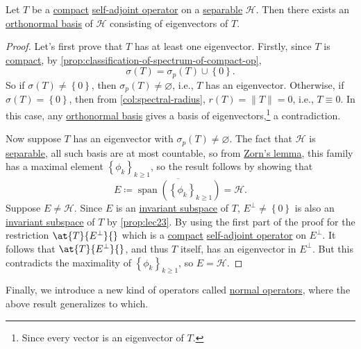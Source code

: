 \begin{theorem}\label{thm:spectral-theorem-for-compact-self-adjoint-op}
	Let \(T\) be a \hyperref[def:compact-op]{compact} \hyperref[def:self-adjoint-op]{self-adjoint operator} on a \hyperref[def:separable]{separable} \(\mathcal{H} \). Then there exists an \hyperref[def:orthonormal-basis]{orthonormal basis} of \(\mathcal{H} \) consisting of eigenvectors of \(T\).
\end{theorem}
\begin{proof}
	Let's first prove that \(T\) has at least one eigenvector. Firstly, since \(T\) is \hyperref[def:compact-op]{compact}, by \autoref{prop:classification-of-spectrum-of-compact-op},
	\[
		\sigma (T) = \sigma _p(T) \cup \left\{ 0 \right\}.
	\]
	So if \(\sigma (T) \neq \left\{ 0 \right\} \), then \(\sigma _p(T) \neq \varnothing \), i.e., \(T\) has an eigenvector. Otherwise, if \(\sigma (T) = \left\{ 0 \right\} \), then from \autoref{col:spectral-radius}, \(r(T) = \lVert T \rVert = 0\), i.e., \(T \equiv 0\). In this case, any \hyperref[def:orthonormal-basis]{orthonormal basis} gives a basis of eigenvectors,\footnote{Since every vector is an eigenvector of \(T\).} a contradiction.

	Now suppose \(T\) has an eigenvector with \(\sigma_p (T) \neq \varnothing \). The fact that \(\mathcal{H} \) is \hyperref[def:separable]{separable}, all such basis are at most countable, so from \href{https://en.wikipedia.org/wiki/Zorn%27s_lemma}{Zorn's lemma}, this family has a maximal element \(\left\{ \phi _k \right\}_{k\geq 1} \), so the result follows by showing that 
	\[
		E \coloneqq \overline{\mathop{\mathrm{span}}(\left\{ \phi _k \right\}_{k\geq 1} )} = \mathcal{H} .
	\]
	Suppose \(E \neq \mathcal{H} \). Since \(E\) is an \hyperref[def:invariant-subspace]{invariant subspace} of \(T\), \(E^{\perp} \neq \left\{ 0 \right\} \) is also an \hyperref[def:invariant-subspace]{invariant subspace} of \(T\) by \autoref{prop:lec23}. By using the first part of the proof for the restriction \(\at{T}{E^{\perp} }{} \) which is a \hyperref[def:compact-op]{compact} \hyperref[def:self-adjoint-op]{self-adjoint operator} on \(E^{\perp} \). It follows that \(\at{T}{E^{\perp} }{} \), and thus \(T\) itself, has an eigenvector in \(E^{\perp} \). But this contradicts the maximality of \(\left\{ \phi _k \right\}_{k\geq 1} \), so \(E = \mathcal{H} \).
\end{proof}

Finally, we introduce a new kind of operators called \hyperref[def:normal-op]{normal operators}, where the above result generalizes to which.

